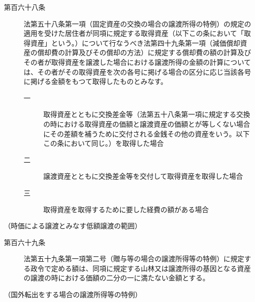 \documentclass[twocolumn,a4j,10pt]{ltjtarticle}
\begin{document}
\begin{description}
\item[第百六十八条]法第五十八条第一項（固定資産の交換の場合の譲渡所得の特例）の規定の適用を受けた居住者が同項に規定する取得資産（以下この条において「取得資産」という。）について行なうべき法第四十九条第一項（減価償却資産の償却費の計算及びその償却の方法）に規定する償却費の額の計算及びその者が取得資産を譲渡した場合における譲渡所得の金額の計算については、その者がその取得資産を次の各号に掲げる場合の区分に応じ当該各号に掲げる金額をもつて取得したものとみなす。
\begin{description}
\item[一]取得資産とともに交換差金等（法第五十八条第一項に規定する交換の時における取得資産の価額と譲渡資産の価額とが等しくない場合にその差額を補うために交付される金銭その他の資産をいう。以下この条において同じ。）を取得した場合
\item[二]譲渡資産とともに交換差金等を交付して取得資産を取得した場合
\item[三]取得資産を取得するために要した経費の額がある場合
\end{description}
\end{description}
\noindent\hspace{10pt}（時価による譲渡とみなす低額譲渡の範囲）
\begin{description}
\item[第百六十九条]法第五十九条第一項第二号（贈与等の場合の譲渡所得等の特例）に規定する政令で定める額は、同項に規定する山林又は譲渡所得の基因となる資産の譲渡の時における価額の二分の一に満たない金額とする。
\end{description}
\noindent\hspace{10pt}（国外転出をする場合の譲渡所得等の特例）
\end{document}
